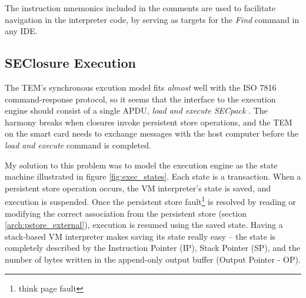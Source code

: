 

The instruction mnemonics included in the comments are used to facilitate
navigation in the interpreter code, by serving as targets for the \textit{Find}
command in any IDE.

\subsection{SEClosure Execution}
The TEM's synchronous excution model fits \textit{almost} well with the ISO
7816 command-response protocol, so it seems that the interface to the
execution engine should consist of a single APDU, \textit{load and execute
SECpack} . The harmony breaks when closures invoke persistent store operations,
and the TEM on the smart card needs to exchange messages with the host computer
before the \textit{load and execute} command is completed.

My solution to this problem was to model the execution engine as the state
machine illustrated in figure \ref{fig:exec_states}. Each state is a
transaction. When a persistent store operation occurs, the VM interpreter's
state is saved, and execution is suspended. Once the persistent store
fault\footnote{think page fault} is resolved by reading or modifying the correct
association from the persistent store (section \ref{arch:pstore_external}),
execution is resumed using the saved state. Having a stack-based VM interpreter
makes saving its state really easy -- the state is completely described by the
Instruction Pointer (IP), Stack Pointer (SP), and the number of bytes written in
the append-only output buffer (Output Pointer - OP). 

